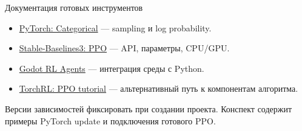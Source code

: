 \documentclass[aspectratio=169]{beamer}
\begin{document}
\begin{frame}{Документация готовых инструментов}
  \begin{itemize}
    \item \href{https://docs.pytorch.org/docs/stable/distributions.html\#categorical}
      {PyTorch: Categorical} --- sampling и log probability.
    \item \href{https://stable-baselines3.readthedocs.io/en/stable/modules/ppo.html}
      {Stable-Baselines3: PPO} --- API, параметры, CPU/GPU.
    \item \href{https://github.com/edbeeching/godot_rl_agents}
      {Godot RL Agents} --- интеграция среды с Python.
    \item \href{https://docs.pytorch.org/tutorials/intermediate/reinforcement_ppo.html}
      {TorchRL: PPO tutorial} --- альтернативный путь к компонентам алгоритма.
  \end{itemize}
  Версии зависимостей фиксировать при создании проекта.
  Конспект содержит примеры PyTorch update и подключения готового PPO.
\end{frame}
\end{document}
